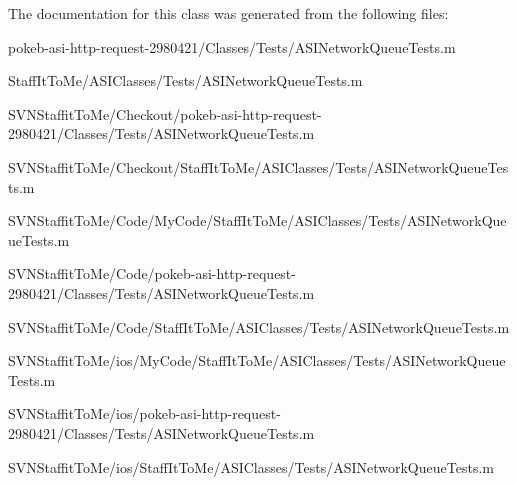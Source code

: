 \-The documentation for this class was generated from the following files\-:\begin{DoxyCompactItemize}
\item 
pokeb-\/asi-\/http-\/request-\/2980421/\-Classes/\-Tests/\-A\-S\-I\-Network\-Queue\-Tests.\-m\item 
\-Staff\-It\-To\-Me/\-A\-S\-I\-Classes/\-Tests/\-A\-S\-I\-Network\-Queue\-Tests.\-m\item 
\-S\-V\-N\-Staffit\-To\-Me/\-Checkout/pokeb-\/asi-\/http-\/request-\/2980421/\-Classes/\-Tests/\-A\-S\-I\-Network\-Queue\-Tests.\-m\item 
\-S\-V\-N\-Staffit\-To\-Me/\-Checkout/\-Staff\-It\-To\-Me/\-A\-S\-I\-Classes/\-Tests/\-A\-S\-I\-Network\-Queue\-Tests.\-m\item 
\-S\-V\-N\-Staffit\-To\-Me/\-Code/\-My\-Code/\-Staff\-It\-To\-Me/\-A\-S\-I\-Classes/\-Tests/\-A\-S\-I\-Network\-Queue\-Tests.\-m\item 
\-S\-V\-N\-Staffit\-To\-Me/\-Code/pokeb-\/asi-\/http-\/request-\/2980421/\-Classes/\-Tests/\-A\-S\-I\-Network\-Queue\-Tests.\-m\item 
\-S\-V\-N\-Staffit\-To\-Me/\-Code/\-Staff\-It\-To\-Me/\-A\-S\-I\-Classes/\-Tests/\-A\-S\-I\-Network\-Queue\-Tests.\-m\item 
\-S\-V\-N\-Staffit\-To\-Me/ios/\-My\-Code/\-Staff\-It\-To\-Me/\-A\-S\-I\-Classes/\-Tests/\-A\-S\-I\-Network\-Queue\-Tests.\-m\item 
\-S\-V\-N\-Staffit\-To\-Me/ios/pokeb-\/asi-\/http-\/request-\/2980421/\-Classes/\-Tests/\-A\-S\-I\-Network\-Queue\-Tests.\-m\item 
\-S\-V\-N\-Staffit\-To\-Me/ios/\-Staff\-It\-To\-Me/\-A\-S\-I\-Classes/\-Tests/\-A\-S\-I\-Network\-Queue\-Tests.\-m\end{DoxyCompactItemize}
